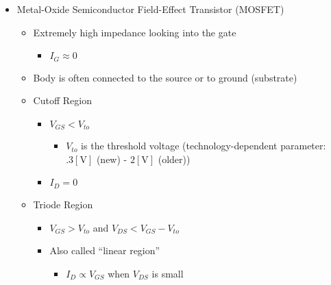 \begin{itemize}

  \item Metal-Oxide Semiconductor Field-Effect Transistor (MOSFET)

    \begin{itemize}

      \item Extremely high impedance looking into the gate

        \begin{itemize}
            
          \item $I_G\approx 0$

        \end{itemize}

      \item Body is often connected to the source or to ground (substrate)

      \item Cutoff Region

        \begin{itemize}

          \item $V_{GS}<V_{to}$

            \begin{itemize}

              \item $V_{to}$ is the threshold voltage (technology-dependent parameter: $.3[\si{\volt}]$ (new) - $2[\si{\volt}]$ (older))

            \end{itemize}

          \item $I_D=0$

        \end{itemize}

      \item Triode Region

        \begin{itemize}

          \item $V_{GS}>V_{to}$ and $V_{DS}<V_{GS}-V_{to}$

          \item Also called ``linear region''

            \begin{itemize}

              \item $I_D\propto V_{GS}$ when $V_{DS}$ is small


\end{itemize}
\end{itemize}
\end{itemize}
\end{itemize}
